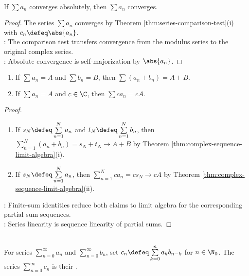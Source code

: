 \begin{theorem} \label{thm:absolute-convergence-implies-convergence} \\
If $\sum a_n$ converges absolutely, then $\sum a_n$ converges.
\begin{proof}
The series $\sum a_n$ converges by Theorem \ref{thm:series-comparison-test}(i) with $c_n\defeq\abs{a_n}$.\\
: The comparison test transfers convergence from the modulus series to the original complex series.\\
: Absolute convergence is self-majorization by $\abs{a_n}$.
\end{proof}
\end{theorem}

\begin{theorem} \label{thm:linearity-of-convergent-series} 
\begin{enumerate}[label=(\roman*)]
\setlength{\itemsep}{0pt}
\item If $\sum a_n=A$ and $\sum b_n=B$, then $\sum(a_n+b_n)=A+B$.
\item If $\sum a_n=A$ and $c\in\C$, then $\sum ca_n=cA$.
\end{enumerate}
\begin{proof}
\begin{enumerate}[label=(\roman*)]
\setlength{\itemsep}{0pt}
\item If $s_N\defeq\sum\limits_{n=1}^{N}a_n$ and $t_N\defeq\sum\limits_{n=1}^{N}b_n$, then $\sum\limits_{n=1}^{N}(a_n+b_n)=s_N+t_N\to A+B$ by Theorem \ref{thm:complex-sequence-limit-algebra}(i).
\item If $s_N\defeq\sum\limits_{n=1}^{N}a_n$, then $\sum\limits_{n=1}^{N}ca_n=cs_N\to cA$ by Theorem \ref{thm:complex-sequence-limit-algebra}(ii).
\end{enumerate}
: Finite-sum identities reduce both claims to limit algebra for the corresponding partial-sum sequences.\\
: Series linearity is sequence linearity of partial sums.
\end{proof}
\end{theorem}

\begin{definition} \label{def:cauchy-product-of-series} \\
For series $\sum\limits_{n=0}^{\infty}a_n$ and $\sum\limits_{n=0}^{\infty}b_n$, set $c_n\defeq\sum\limits_{k=0}^{n}a_kb_{n-k}$ for $n\in\N_0$. The series $\sum\limits_{n=0}^{\infty}c_n$ is their .
\end{definition}


